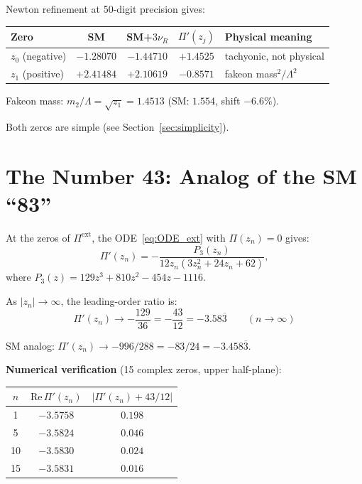 \documentclass[11pt,a4paper]{article}
\begin{document}
Newton refinement at 50-digit precision gives:

\begin{center}
\begin{tabular}{lcccl}
\toprule
\textbf{Zero} & \textbf{SM} & \textbf{SM+$3\nu_R$} & \textbf{$\Pi'(z_j)$} & \textbf{Physical meaning} \\
\midrule
$z_0$ (negative) & $-1.28070$ & $\mathbf{-1.44710}$ & $+1.4525$ & tachyonic, not physical \\
$z_1$ (positive) & $+2.41484$ & $\mathbf{+2.10619}$ & $-0.8571$ & fakeon mass${}^2/\Lambda^2$ \\
\bottomrule
\end{tabular}
\end{center}

Fakeon mass: $m_2/\Lambda = \sqrt{z_1} = 1.4513$ (SM: $1.554$, shift $-6.6\%$).

Both zeros are simple (see Section~\ref{sec:simplicity}).


\section{The Number 43: Analog of the SM ``83''}
\label{sec:43}

At the zeros of $\Pi^{\mathrm{ext}}$, the ODE~\eqref{eq:ODE_ext} with $\Pi(z_n) = 0$ gives:
\begin{equation}
  \Pi'(z_n) = -\frac{P_3(z_n)}{12z_n(3z_n^2 + 24z_n + 62)},
\end{equation}
where $P_3(z) = 129z^3 + 810z^2 - 454z - 1116$.

As $|z_n| \to \infty$, the leading-order ratio is:
\begin{equation}
  \boxed{
    \Pi'(z_n) \to -\frac{129}{36} = -\frac{43}{12} = -3.58\overline{3}
    \qquad (n \to \infty)
  }
\end{equation}

\noindent SM analog: $\Pi'(z_n) \to -996/288 = -83/24 = -3.458\overline{3}$.

\medskip
\noindent\textbf{Numerical verification} (15 complex zeros, upper half-plane):

\begin{center}
\begin{tabular}{ccc}
\toprule
$n$ & $\mathrm{Re}\,\Pi'(z_n)$ & $|\Pi'(z_n) + 43/12|$ \\
\midrule
1 & $-3.5758$ & $0.198$ \\
5 & $-3.5824$ & $0.046$ \\
10 & $-3.5830$ & $0.024$ \\
15 & $-3.5831$ & $0.016$ \\
\bottomrule
\end{tabular}
\end{center}
\end{document}
